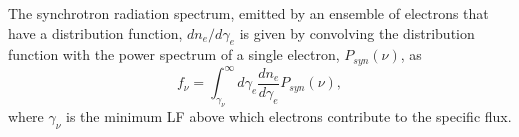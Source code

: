 %
%
The synchrotron radiation spectrum, emitted by an ensemble of electrons that have a 
distribution function, $dn_e/d\gamma_e$ 
is given by convolving the distribution function with the power spectrum of a single 
electron, $P_{syn}(\nu)$, as 
%
\begin{equation}
f_{\nu} = \int_{\gamma_{\nu}}^{\infty} d\gamma_e \frac{dn_e}{d\gamma_e}P_{syn}(\nu), 
\label{eq:afterglow:sync_power}
\end{equation}
%
where $\gamma_{\nu}$ is the minimum \ac{LF} above which electrons contribute to the 
specific flux.
%
%
